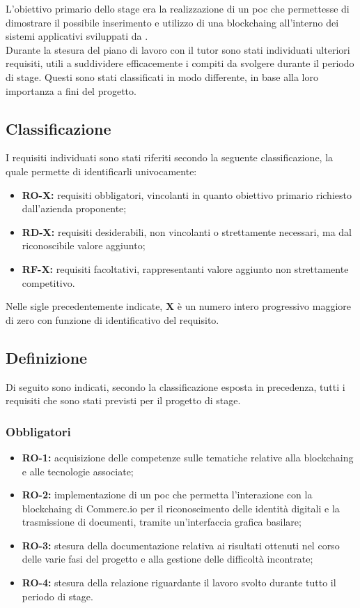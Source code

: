 L'obiettivo primario dello stage era la realizzazione di un \gls{poc} che permettesse di dimostrare il possibile inserimento e utilizzo di una \gls{blockchaing} all'interno dei sistemi applicativi sviluppati da \myCompany{} \companyTitle.\\
Durante la stesura del piano di lavoro con il tutor \myTutor sono stati individuati ulteriori requisiti, utili a suddividere efficacemente i compiti da svolgere durante il periodo di stage. Questi sono stati classificati in modo differente, in base alla loro importanza a fini del progetto.

\subsection*{Classificazione}
I requisiti individuati sono stati riferiti secondo la seguente classificazione, la quale permette di identificarli univocamente:
\begin{itemize}
	\item \textbf{RO-X:} requisiti obbligatori, vincolanti in quanto obiettivo primario richiesto dall'azienda proponente;
	\item \textbf{RD-X:} requisiti desiderabili, non vincolanti o strettamente necessari, ma dal riconoscibile valore aggiunto;
	\item \textbf{RF-X:} requisiti facoltativi, rappresentanti valore aggiunto non strettamente competitivo.
\end{itemize}

Nelle sigle precedentemente indicate, \textbf{X} è un numero intero progressivo maggiore di zero con funzione di identificativo del requisito.

\subsection*{Definizione}
Di seguito sono indicati, secondo la classificazione esposta in precedenza, tutti i requisiti che sono stati previsti per il progetto di stage.

\subsubsection*{Obbligatori}
\begin{itemize}
	\item \textbf{RO-1:} acquisizione delle competenze sulle tematiche relative alla \gls{blockchaing} e alle tecnologie associate;
	\item \textbf{RO-2:} implementazione di un \gls{poc} che permetta l'interazione con la \gls{blockchaing} di Commerc.io per il riconoscimento delle identità digitali e la trasmissione di documenti, tramite un'interfaccia grafica basilare;
	\item \textbf{RO-3:} stesura della documentazione relativa ai risultati ottenuti nel corso delle varie fasi del progetto e alla gestione delle difficoltà incontrate;
	\item \textbf{RO-4:} stesura della relazione riguardante il lavoro svolto durante tutto il periodo di stage.
\end{itemize}


